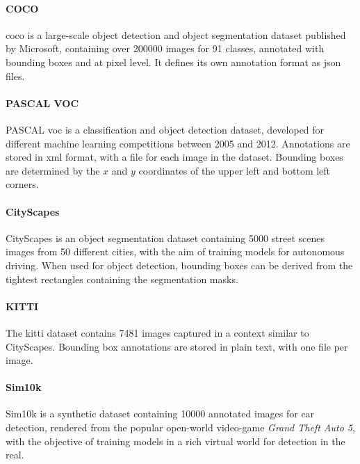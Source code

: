 \documentclass[%
    corpo=12pt,
    twoside,
    stile=classica,   
    tipotesi=magistrale,
    evenboxes,
    english,
	numerazioneromana,
]{toptesi}
\begin{document}
\paragraph{COCO}\label{sec:coco}
\gls{coco} is a large-scale object detection and object segmentation dataset published by Microsoft, containing over 200000 images for 91 classes, annotated with bounding boxes and at pixel level\cite{lin2015microsoft}. It defines its own annotation format as \acrshort{json} files.

\paragraph{PASCAL VOC}
PASCAL \gls{voc} is a classification and object detection dataset, developed for different machine learning competitions between 2005 and 2012\cite{voc}. Annotations are stored in \acrshort{xml} format, with a file for each image in the dataset. Bounding boxes are determined by the $x$ and $y$ coordinates of the upper left and bottom left corners.

\paragraph{CityScapes}
CityScapes is an object segmentation dataset containing 5000 street scenes images from 50 different cities, with the aim of training models for autonomous driving\cite{cordts2016cityscapes}. When used for object detection, bounding boxes can be derived from the tightest rectangles containing the segmentation masks.

\paragraph{KITTI}
The \gls{kitti} dataset\cite{Geiger2013IJRR} contains 7481 images captured in a context similar to CityScapes. Bounding box annotations are stored in plain text, with one file per image.

\paragraph{Sim10k}
Sim10k is a synthetic dataset containing 10000 annotated images for car detection, rendered from the popular open-world video-game \textit{Grand Theft Auto 5}, with the objective of training models in a rich virtual world for detection in the real\cite{johnsonroberson2017driving}.
\end{document}
